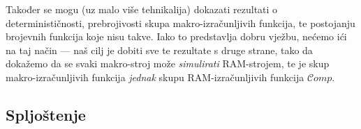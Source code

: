 Također se mogu (uz malo više tehnikalija) dokazati rezultati o determinističnosti, prebrojivosti skupa makro-izračunljivih funkcija, te postojanju brojevnih funkcija koje nisu takve. Iako to predstavlja dobru vježbu, nećemo ići na taj način --- naš cilj je dobiti sve te rezultate s druge strane, tako da dokažemo da se svaki makro-stroj može \emph{simulirati} RAM-strojem, te je skup makro-izračunljivih funkcija \emph{jednak} skupu RAM-izračunljivih funkcija $\mathcal Comp$.





\subsection{Spljoštenje}

